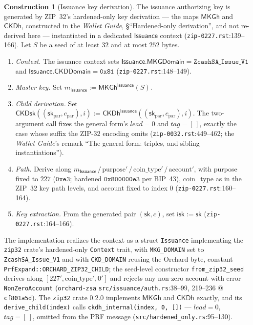 \documentclass[11pt,a4paper]{article}
\theoremstyle{definition}
\newtheorem{construction}[theorem]{Construction}
\begin{document}
\begin{construction}[Issuance key derivation]\label{const:zsa-isk-derivation}
The issuance authorizing key is generated by ZIP~32's hardened-only key
derivation --- the maps $\mathsf{MKGh}$ and $\mathsf{CKDh}$, constructed in
the \emph{Wallet Guide}, \S``Hardened-only derivation'', and not re-derived
here --- instantiated in a dedicated $\mathsf{Issuance}$ context
(\texttt{zip-0227.rst}:139--166). Let $S$ be a seed of at least $32$ and at
most $252$ bytes.
\begin{enumerate}[label=(\arabic*)]
\item \emph{Context.} The issuance context sets
  $\mathsf{Issuance.MKGDomain} = \texttt{ZcashSA\_Issue\_V1}$ and
  $\mathsf{Issuance.CKDDomain} = \mathtt{0x81}$
  (\texttt{zip-0227.rst}:148--149).
\item \emph{Master key.} Set
  $m_{\mathsf{Issuance}} := \mathsf{MKGh}^{\mathsf{Issuance}}(S)$.
\item \emph{Child derivation.} Set
  $\mathsf{CKDsk}((\mathsf{sk}_{\mathrm{par}}, c_{\mathrm{par}}), i) :=
  \mathsf{CKDh}^{\mathsf{Issuance}}((\mathsf{sk}_{\mathrm{par}},
  c_{\mathrm{par}}), i)$. The two-argument call fixes the general form's
  $\mathit{lead} = 0$ and $\mathit{tag} = [\,]$, exactly the case whose
  suffix the ZIP-32 encoding omits (\texttt{zip-0032.rst}:449--462; the
  \emph{Wallet Guide}'s remark ``The general form: triples, and sibling
  instantiations'').
\item \emph{Path.} Derive along
  $m_{\mathsf{Issuance}} \,/\, \mathrm{purpose}' \,/\,
  \mathrm{coin\_type}' \,/\, \mathrm{account}'$, with purpose fixed to
  $227$ ($\mathtt{0xe3}$; hardened $\mathtt{0x800000e3}$ per BIP~43),
  coin\_type as in the ZIP~32 key path levels, and account fixed to index
  $0$ (\texttt{zip-0227.rst}:160--164).
\item \emph{Key extraction.} From the generated pair $(\mathsf{sk}, c)$,
  set $\mathsf{isk} := \mathsf{sk}$ (\texttt{zip-0227.rst}:164--166).
\end{enumerate}
\end{construction}

The implementation realizes the context as a struct \texttt{Issuance}
implementing the \texttt{zip32} crate's hardened-only \texttt{Context}
trait, with \texttt{MKG\_DOMAIN} set to \texttt{ZcashSA\_Issue\_V1} and
with \texttt{CKD\_DOMAIN} reusing the Orchard byte, constant
\texttt{PrfExpand::ORCHARD\_ZIP32\_CHILD}; the seed-level constructor
\texttt{from\_zip32\_seed} derives along
$[227', \mathrm{coin\_type}', 0']$ and rejects any non-zero account with
error \texttt{NonZeroAccount} (\texttt{orchard-zsa}
\texttt{src/issuance/auth.rs}:38--99, 219--236 @ \texttt{cf801a5d}). The
\texttt{zip32} crate 0.2.0 implements $\mathsf{MKGh}$ and $\mathsf{CKDh}$
exactly, and its \texttt{derive\_child(index)} calls
\texttt{ckdh\_internal(index, 0, [])} --- $\mathit{lead} = 0$,
$\mathit{tag} = [\,]$, omitted from the PRF message
(\texttt{src/hardened\_only.rs}:95--130).
\end{document}
